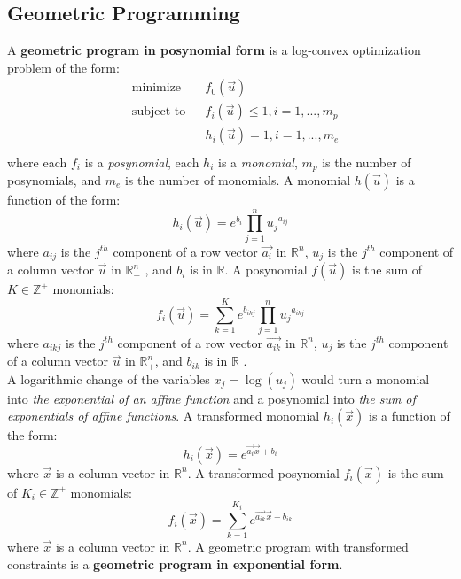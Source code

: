 \subsection{Geometric Programming}
A \textbf{geometric program in posynomial form} is a log-convex optimization problem of the form:
\begin{equation}
\begin{aligned}
	& \text{minimize} && f_0 \left(\vec{u}\right) \\
	& \text{subject to} && f_i \left(\vec{u}\right) \leq 1, i = 1,...,m_p\\
	& && h_i \left(\vec{u}\right) = 1, i = 1, ...,m_e\\
\end{aligned}
\label{GP_standard}
\end{equation}
where each $f_i$ is a {\em posynomial}, each $h_i$ is a {\em monomial}, $m_p$ is the number of posynomials, and $m_e$ is the number of monomials. A monomial $h(\vec{u})$ is a function of the form:
\begin{displaymath}
	h_i(\vec{u}) = e^{b_i}\textstyle{\prod}_{j=1}^{n}{u_j}^{a_{ij}}
\end{displaymath}
where $a_{ij}$ is the $j^{th}$ component of a row vector $\vec{a_i}$ in $\mathbb{R}^n$, $u_j$ is the $j^{th}$ component of a column vector $\vec{u}$ in $\mathbb{R}^n_+$ , and $b_i$ is in $\mathbb{R}$. A posynomial $f(\vec{u})$ is the sum of $K \in \mathbb{Z}^+$ monomials:
\begin{displaymath}
	f_i(\vec{u}) = \textstyle{\sum_{k=1}^{K}}e^{b_{ikj}}\prod_{j=1}^{n}{u_j}^{a_{ikj}}
\end{displaymath}
where $a_{ikj}$ is the $j^{th}$ component of a row vector $\vec{a_{ik}}$ in $\mathbb{R}^n$, $u_j$ is the $j^{th}$ component of a column vector $\vec{u}$ in $\mathbb{R}^n_+$, and $b_{ik}$ is in $\mathbb{R}$ \cite{GP_tutorial}.\\
A logarithmic change of the variables $x_j = \log(u_j)$ would turn a monomial into {\em  the exponential of an affine function} and a posynomial into {\em the sum of exponentials of affine functions}. A transformed monomial $h_i(\vec{x})$ is a function of the form:
\begin{displaymath}
    h_i(\vec{x}) = e^{\vec{a_i}\vec{x} + b_i}
\end{displaymath}
where $\vec{x}$ is a column vector in $\mathbb{R}^n$. A transformed posynomial $f_i(\vec{x})$ is the sum of $K_i \in \mathbb{Z}^+$ monomials:
\begin{displaymath}
    f_i(\vec{x}) = \textstyle{\sum_{k=1}^{K_i}}e^{\vec{a_{ik}}\vec{x} + b_{ik}}
\end{displaymath}
where $\vec{x}$ is a column vector in $\mathbb{R}^n$. A geometric program with transformed constraints is a \textbf{geometric program in exponential form}.


